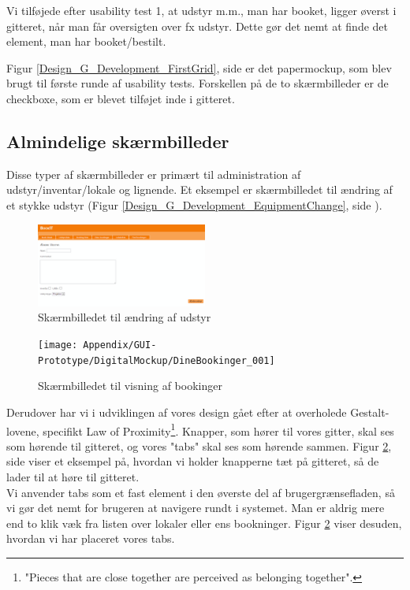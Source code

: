 Vi tilføjede efter usability test 1, at udstyr m.m., man har booket, ligger øverst i gitteret, når man får oversigten over fx udstyr. Dette gør det nemt at finde det element, man har booket/bestilt.

Figur \ref{Design_G_Development_FirstGrid}, side \pageref{Design_G_Development_FirstGrid} er det papermockup, som blev brugt til første runde af usability tests. Forskellen på de to skærmbilleder er de checkboxe, som er blevet tilføjet inde i gitteret. 

\subsection{Almindelige skærmbilleder}
\label{Design_G_Development_NormalWindows}
Disse typer af skærmbilleder er primært til administration af udstyr/inventar/lokale og lignende. Et eksempel er skærmbilledet til ændring af et stykke udstyr (Figur \ref{Design_G_Development_EquipmentChange}, side \pageref{Design_G_Development_EquipmentChange}). 

\begin{figure}[h!]
  \centering
    \includegraphics[width=0.5\textwidth]{Appendix/GUI-Prototype/DigitalMockup/AendreUdstyr}
  \caption{Skærmbilledet til ændring af udstyr}
\label{Design_G_Development_EquipmentChangeV1}
\end{figure} 

\begin{figure}[h!]
  \centering
    \texttt{[image: Appendix/GUI-Prototype/DigitalMockup/DineBookinger\_001]}
  \caption{Skærmbilledet til visning af bookinger}
\label{Design_G_Development_YourBookings}
\end{figure} 

Derudover har vi i udviklingen af vores design gået efter at overholede Gestalt-lovene\cite[s. 68]{SL_UID}, specifikt Law of Proximity\footnote{"Pieces that are close together are perceived as belonging together".}. Knapper, som hører til vores gitter, skal ses som hørende til gitteret, og vores "tabs" skal ses som hørende sammen. Figur \ref{Design_G_Development_YourBookings}, side \pageref{Design_G_Development_YourBookings} viser et eksempel på, hvordan vi holder knapperne tæt på gitteret, så de lader til at høre til gitteret.
\\Vi anvender tabs som et fast element i den øverste del af brugergrænsefladen, så vi gør det nemt for brugeren at navigere rundt i systemet. Man er aldrig mere end to klik væk fra listen over lokaler eller ens bookninger. Figur \ref{Design_G_Development_YourBookings} viser desuden, hvordan vi har placeret vores tabs.